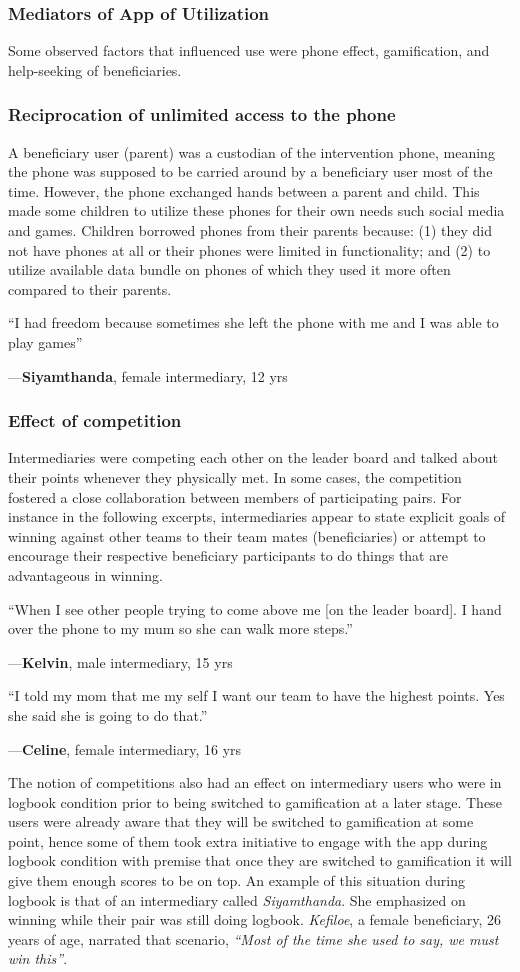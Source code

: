 \documentclass{sig-alternate}
\newenvironment{myquote}
               {\list{}{\rightmargin   \leftmargin
                        \parsep        0in }%
                \item\relax}
               {\endlist}
\newcommand{\userquote}[2]{\begin{samepage}\begin{myquote} 
     \em{\small{#2\begin{flushright}---#1\end{flushright}}}
   \end{myquote}\end{samepage}}
\begin{document}
\subsubsection{Mediators of App of Utilization}
Some observed factors that influenced use were phone effect, gamification, and help-seeking of beneficiaries.
\subsubsection*{\textbf{Reciprocation of unlimited access to the phone}}
A beneficiary user (parent) was a custodian of the intervention phone, meaning the phone was supposed to be carried around by a beneficiary user most of the time. However, the phone exchanged hands between a parent and child. This made some children to utilize these phones for their own needs such social media and games. Children borrowed phones from their parents because: (1) they did not have phones at all or their phones were limited in functionality; and (2) to utilize available data bundle on phones of which they used it more often compared to their parents.

\userquote{\textbf{Siyamthanda}, female intermediary, 12 yrs} {``I had freedom because sometimes she left the phone with me and I was able to play games''}

\subsubsection*{\textbf{Effect of competition}}
Intermediaries were competing each other on the leader board and talked about their points whenever they physically met. In some cases, the competition fostered a close collaboration between members of participating pairs. For instance in the following excerpts, intermediaries appear to state explicit goals of winning against other teams to their team mates (beneficiaries) or attempt to encourage their respective beneficiary participants to do things that are advantageous in winning.

\userquote{\textbf{Kelvin}, male intermediary, 15 yrs} {``When I see other people trying to come above me [on the leader board]. I hand over the phone to my mum so she can walk more steps.''} 

\userquote{\textbf{Celine}, female intermediary, 16 yrs} {``I told my mom that me my self I want our team to have the highest points. Yes she said she is going to do that.''} 

The notion of competitions also had an effect on intermediary users who were in logbook condition prior to being switched to gamification at a later stage. These users were already aware that they will be switched to gamification at some point, hence some of them took extra initiative to engage with the app during logbook condition with premise that once they are switched to gamification it will give them enough scores to be on top. An example of this situation during logbook is that of an intermediary called  \emph{Siyamthanda}. She emphasized on winning while their pair was still doing logbook. \emph{Kefiloe}, a female beneficiary, 26 years of age, narrated that scenario, \emph{``Most of the time she used to say, we must win this''}. 
\end{document}
